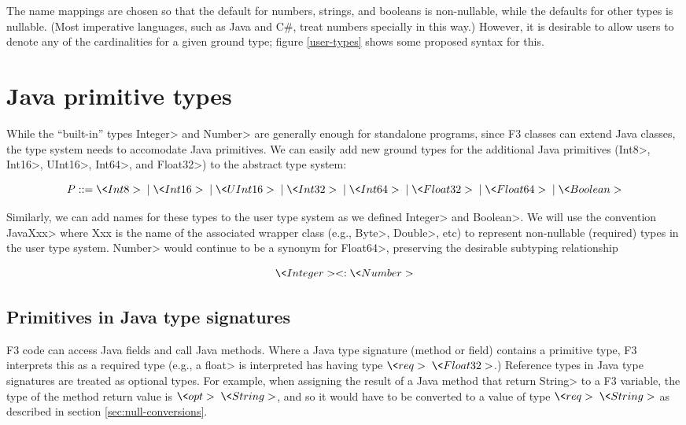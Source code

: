 \documentclass{article}
\newcommand{\req}{\<req>\;}
\newcommand{\opt}{\<opt>\;}
\newcommand{\alt}{\;|\;}
\begin{document}
The name mappings are chosen so that the default for numbers, strings,
and booleans is non-nullable, while the defaults for other types is
nullable.  (Most imperative languages, such as Java and C\#, treat
numbers specially in this way.)  However, it is desirable to allow
users to denote any of the cardinalities for a given ground type; 
figure \ref{user-types} shows some proposed syntax for this.


\section{Java primitive types}

While the ``built-in'' types \<Integer> and \<Number> are generally
enough for standalone programs, since F3 classes can extend Java
classes, the type system needs to accomodate Java primitives.  We can
easily add new ground types for the additional Java primitives
(\<Int8>, \<Int16>, \<UInt16>, \<Int64>, and \<Float32>) to the abstract type system: 

\[
     P ::= \<Int8> \alt \<Int16> \alt \<UInt16> \alt \<Int32> \alt \<Int64> \alt \<Float32> \alt \<Float64> \alt \<Boolean> 
\]

Similarly, we can add names for these types to the user type system as we defined \<Integer>
and \<Boolean>.  We will use the convention \<JavaXxx> where Xxx is the name of the associated wrapper class (e.g., \<Byte>, \<Double>, etc) to represent non-nullable (required) types in the user type
system.  \<Number> would continue to be a synonym for \<Float64>, preserving the desirable subtyping relationship

\[ \<Integer> <: \<Number> \]

\subsection{Primitives in Java type signatures}

F3 code can access Java fields and call Java methods.  Where a Java
type signature (method or field) contains a primitive type, F3 interprets this 
as a required type (e.g., a \<float> is interpreted has having type $\req \<Float32>$.)  
Reference types in Java type signatures are treated as optional types.  
For example, when assigning the
result of a Java method that return \<String> to a F3 variable, the type
of the method return value is $\opt \<String>$, and so it would have to be converted
to a value of type $\req \<String>$ as described in section \ref{sec:null-conversions}.  
\end{document}
